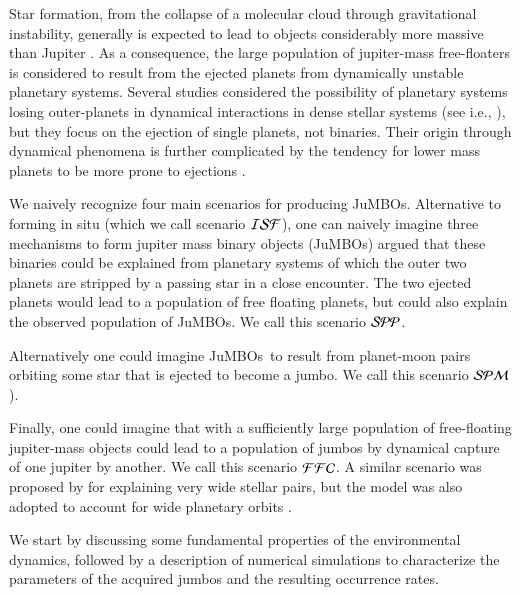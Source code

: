 \documentclass[aa]{lib/aa}
\newcommand{\jumbos}{\mbox{JuMBOs}}
\begin{document}
Star formation, from the collapse of a molecular cloud through
gravitational instability, generally is expected to lead to objects
considerably more massive than Jupiter
\citep{1976MNRAS.176..367L,2005A&A...430.1059B}.  As a consequence,
the large population of jupiter-mass free-floaters is considered to
result from the ejected planets from dynamically unstable planetary
systems.  Several studies considered the possibility of planetary
systems losing outer-planets in dynamical interactions in dense
stellar systems (see i.e.,
\citep{1996Sci...274..954R,2015MNRAS.453.2759Z, 2017MNRAS.470.4337C,
  2019MNRAS.489.2280F, 2019A&A...624A.120V}), but they focus on the
ejection of single planets, not binaries.  Their origin through
dynamical phenomena is further complicated by the tendency for lower
mass planets to be more prone to ejections
\citep{2001Icar..150..303F,2013MNRAS.433..867H,2019MNRAS.489.2280F,2020MNRAS.497.1807S}.

We naively recognize four main scenarios for producing \jumbos.
Alternative to forming in situ (which we call scenario ${\cal ISF}$),
one can naively imagine three mechanisms to form jupiter mass binary
objects (\jumbos) \citep{2023arXiv231006016W} argued that these
binaries could be explained from planetary systems of which the outer
two planets are stripped by a passing star in a close encounter. The
two ejected planets would lead to a population of free floating
planets, but could also explain the observed population of \jumbos.
We call this scenario ${\cal SPP}$.

Alternatively one could imagine \jumbos\, to result from planet-moon
pairs orbiting some star that is ejected to become a jumbo.  We call
this scenario ${\cal SPM}$).

Finally, one could imagine that with a sufficiently large population
of free-floating jupiter-mass objects could lead to a population of
jumbos by dynamical capture of one jupiter by another.  We call this
scenario ${\cal FFC}$. A similar scenario was proposed by
\cite{2010MNRAS.404.1835K} for explaining very wide stellar pairs, but
the model was also adopted to account for wide planetary orbits
\citep{2012ApJ...750...83P}.

We start by discussing some fundamental properties of the
environmental dynamics, followed by a description of numerical
simulations to characterize the parameters of the acquired jumbos and
the resulting occurrence rates.

\end{document}
